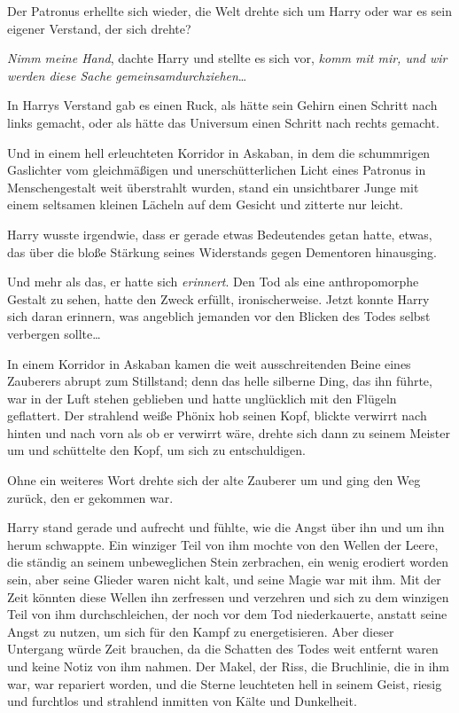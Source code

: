 {Der Patronus erhellte sich wieder, die Welt drehte sich um Harry oder war es sein eigener Verstand, der sich drehte?

\emph{Nimm meine Hand}, dachte Harry und stellte es sich vor, \emph{komm mit mir, und wir werden diese Sache} \emph{gemeinsamdurchziehen}…

In Harrys Verstand gab es einen Ruck, als hätte sein Gehirn einen Schritt nach links gemacht, oder als hätte das Universum einen Schritt nach rechts gemacht.

Und in einem hell erleuchteten Korridor in Askaban, in dem die schummrigen Gaslichter vom gleichmäßigen und unerschütterlichen Licht eines Patronus in Menschengestalt weit überstrahlt wurden, stand ein unsichtbarer Junge mit einem seltsamen kleinen Lächeln auf dem Gesicht und zitterte nur leicht.

Harry wusste irgendwie, dass er gerade etwas Bedeutendes getan hatte, etwas, das über die bloße Stärkung seines Widerstands gegen Dementoren hinausging.

Und mehr als das, er hatte sich \emph{erinnert}. Den Tod als eine anthropomorphe Gestalt zu sehen, hatte den Zweck erfüllt, ironischerweise. Jetzt konnte Harry sich daran erinnern, was angeblich jemanden vor den Blicken des Todes selbst verbergen sollte…

In einem Korridor in Askaban kamen die weit ausschreitenden Beine eines Zauberers abrupt zum Stillstand; denn das helle silberne Ding, das ihn führte, war in der Luft stehen geblieben und hatte unglücklich mit den Flügeln geflattert. Der strahlend weiße Phönix hob seinen Kopf, blickte verwirrt nach hinten und nach vorn als ob er verwirrt wäre, drehte sich dann zu seinem Meister um und schüttelte den Kopf, um sich zu entschuldigen.

Ohne ein weiteres Wort drehte sich der alte Zauberer um und ging den Weg zurück, den er gekommen war.

Harry stand gerade und aufrecht und fühlte, wie die Angst über ihn und um ihn herum schwappte. Ein winziger Teil von ihm mochte von den Wellen der Leere, die ständig an seinem unbeweglichen Stein zerbrachen, ein wenig erodiert worden sein, aber seine Glieder waren nicht kalt, und seine Magie war mit ihm. Mit der Zeit könnten diese Wellen ihn zerfressen und verzehren und sich zu dem winzigen Teil von ihm durchschleichen, der noch vor dem Tod niederkauerte, anstatt seine Angst zu nutzen, um sich für den Kampf zu energetisieren. Aber dieser Untergang würde Zeit brauchen, da die Schatten des Todes weit entfernt waren und keine Notiz von ihm nahmen. Der Makel, der Riss, die Bruchlinie, die in ihm war, war repariert worden, und die Sterne leuchteten hell in seinem Geist, riesig und furchtlos und strahlend inmitten von Kälte und Dunkelheit.

}
